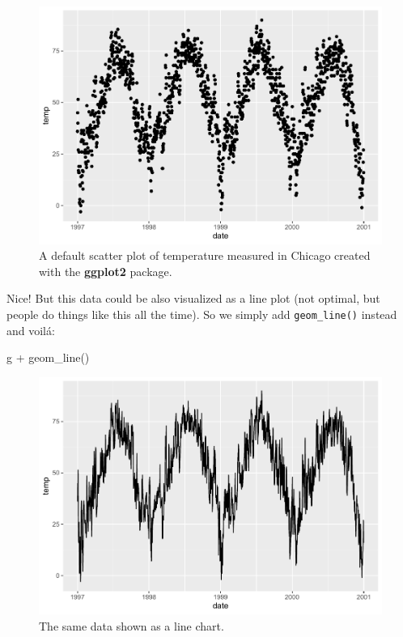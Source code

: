 \documentclass[
]{krantz}
\makeatletter
\newenvironment{Shaded}{\begin{snugshade}}{\end{snugshade}}
\newcommand{\FunctionTok}[1]{\textcolor[rgb]{0,0,0}{#1}}
\newcommand{\NormalTok}[1]{#1}
\newcommand{\SpecialCharTok}[1]{\textcolor[rgb]{0,0,0}{#1}}
\newenvironment{kframe}{%
\medskip{}
\setlength{\fboxsep}{.8em}
 \def\at@end@of@kframe{}%
 \ifinner\ifhmode%
  \def\at@end@of@kframe{\end{minipage}}%
  \begin{minipage}{\columnwidth}%
 \fi\fi%
 \def\FrameCommand##1{\hskip\@totalleftmargin \hskip-\fboxsep
 \colorbox{shadecolor}{##1}\hskip-\fboxsep
     \hskip-\linewidth \hskip-\@totalleftmargin \hskip\columnwidth}%
 \MakeFramed {\advance\hsize-\width
   \@totalleftmargin\z@ \linewidth\hsize
   \@setminipage}}%
 {\par\unskip\endMakeFramed%
 \at@end@of@kframe}
\renewenvironment{Shaded}{\begin{kframe}}{\end{kframe}}
\makeatother
\begin{document}
\begin{figure}
\centering
\includegraphics{bookdown_files/figure-latex/ggplot-default-1.pdf}
\caption{\label{fig:ggplot-default}A default scatter plot of temperature measured in Chicago created with the \textbf{ggplot2} package.}
\end{figure}

Nice! But this data could be also visualized as a line plot (not optimal, but people do things like this all the time). So we simply add \texttt{geom\_line()} instead and voilá:

\begin{Shaded}
\begin{Highlighting}[]
\NormalTok{g }\SpecialCharTok{+} \FunctionTok{geom\_line}\NormalTok{()}
\end{Highlighting}
\end{Shaded}

\begin{figure}
\centering
\includegraphics{bookdown_files/figure-latex/ggplot-default-line-1.pdf}
\caption{\label{fig:ggplot-default-line}The same data shown as a line chart.}
\end{figure}
\end{document}

